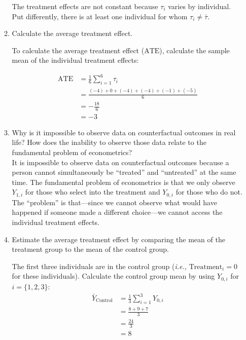 \documentclass[11pt]{article}
\begin{document}
\begin{onehalfspacing}
\begin{enumerate}
\begin{enumerate}
	{\color{pine_green} The treatment effects are not constant because $\tau_i$ varies by individual. Put differently, there is at least one individual for whom $\tau_i \neq \bar{\tau}$.}

	\item Calculate the average treatment effect.
	
	{\color{pine_green} To calculate the average treatment effect ($\text{ATE}$), calculate the sample mean of the individual treatment effects:
		
	\begin{align*}
	\text{ATE} &= \frac{1}{6}\sum_{i=1}^{6} \tau_i \\
			   &= \frac{(-4) + 0 + (-4) + (-4) + (-1) + (-5)}{6} \\
			   &= -\frac{18}{6} \\
			   &= -3
	\end{align*}}
	
	\item Why is it impossible to observe data on counterfactual outcomes in real life? How does the inability to observe those data relate to the fundamental problem of econometrics?\\
	{\color{pine_green} It is impossible to observe data on counterfactual outcomes because a person cannot simultaneously be ``treated'' and ``untreated'' at the same time. The fundamental problem of econometrics is that we only observe $Y_{1,i}$ for those who select into the treatment and $Y_{0,i}$ for those who do not.  The ``problem'' is that---since we cannot observe what would have happened if someone made a different choice---we cannot access the individual treatment effects.}
	
	\item Estimate the average treatment effect by comparing the mean of the treatment group to the mean of the control group. \\
	
	{\color{pine_green} The first three individuals are in the control group (\textit{i.e.,} $\text{Treatment}_i=0$ for these individuals). Calculate the control group mean by using $Y_{0,i}$ for $i=\{1,2,3\}$:
	\begin{align*}
	\bar{Y}_\text{Control} &= \frac{1}{3}\sum_{i=1}^{3} Y_{0,i} \\
	&= \frac{8 + 9 + 7}{3} \\
	&= \frac{24}{3} \\
	&= 8
	\end{align*}

}
\end{enumerate}
\end{enumerate}
\end{onehalfspacing}
\end{document}
